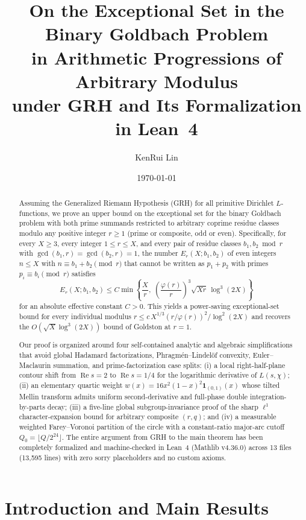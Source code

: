 \documentclass[11pt,reqno]{amsart}
\title[Binary Goldbach Exceptional Set in Arithmetic Progressions under GRH]{%
On the Exceptional Set in the Binary Goldbach Problem\\
in Arithmetic Progressions of Arbitrary Modulus\\
under GRH and Its Formalization in Lean~4}
\author{KenRui Lin}
\date{\today}
\numberwithin{equation}{section}
\theoremstyle{definition}
\newcommand{\1}{\mathbf{1}}
\renewcommand{\Re}{\operatorname{Re}}
\newcommand{\lean}[1]{{\footnotesize\ttfamily\renewcommand{\_}{\textunderscore\allowbreak}#1}}
\newcommand{\GRH}{\textup{GRH}}
\begin{document}
\begin{abstract}
Assuming the Generalized Riemann Hypothesis (GRH) for all primitive Dirichlet $L$-functions, we prove an upper bound on the exceptional set for the binary Goldbach problem with both prime summands restricted to arbitrary coprime residue classes modulo any positive integer $r \ge 1$ (prime or composite, odd or even). Specifically, for every $X \ge 3$, every integer $1 \le r \le X$, and every pair of residue classes $b_1, b_2 \bmod r$ with $\gcd(b_1, r) = \gcd(b_2, r) = 1$, the number $E_r(X; b_1, b_2)$ of even integers $n \le X$ with $n \equiv b_1 + b_2 \pmod r$ that cannot be written as $p_1 + p_2$ with primes $p_i \equiv b_i \pmod r$ satisfies
\[
  E_r(X; b_1, b_2) \le C \min\!\left\{\frac{X}{r},\; \left(\frac{\varphi(r)}{r}\right)^3 \sqrt{X r}\,\log^3(2X)\right\}
\]
for an absolute effective constant $C > 0$. This yields a power-saving exceptional-set bound for every individual modulus $r \le c\, X^{1/3}(r/\varphi(r))^2 / \log^2(2X)$ and recovers the $O(\sqrt{X}\log^3(2X))$ bound of Goldston at $r = 1$.

Our proof is organized around four self-contained analytic and algebraic simplifications that avoid global Hadamard factorizations, Phragm\'en--Lindel\"of convexity, Euler--Maclaurin summation, and prime-factorization case splits: (i) a local right-half-plane contour shift from $\Re s = 2$ to $\Re s = 1/4$ for the logarithmic derivative of $L(s,\chi)$; (ii) an elementary quartic weight $w(x) = 16x^2(1-x)^2\1_{(0,1)}(x)$ whose tilted Mellin transform admits uniform second-derivative and full-phase double integration-by-parts decay; (iii) a five-line global subgroup-invariance proof of the sharp $\ell^1$ character-expansion bound for arbitrary composite $(r,q)$; and (iv) a measurable weighted Farey--Voronoi partition of the circle with a constant-ratio major-arc cutoff $Q_0 = \lfloor Q/2^{24}\rfloor$. The entire argument from \GRH{} to the main theorem has been completely formalized and machine-checked in Lean~4 (Mathlib v4.36.0) across 13 files (13{,}595 lines) with zero \lean{sorry} placeholders and no custom axioms.
\end{abstract}

\maketitle

\tableofcontents

\section{Introduction and Main Results}
\label{sec:intro}
\end{document}
